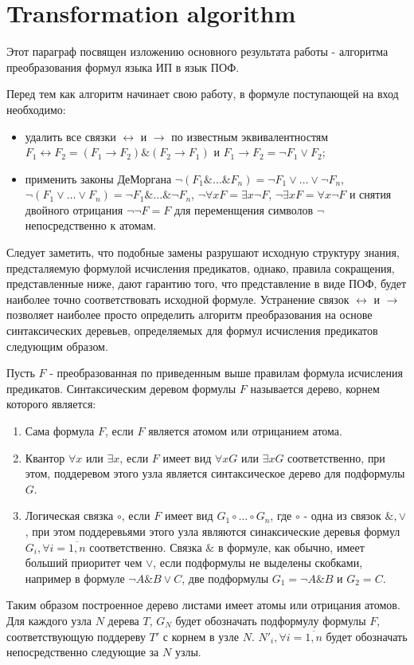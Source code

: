 \documentclass[a4paper,12pt]{article}
\begin{document}
\section{Transformation algorithm}

Этот параграф посвящен изложению основного результата работы - алгоритма преобразования формул языка ИП в язык ПОФ.

Перед тем как алгоритм начинает свою работу, в формуле поступающей на вход необходимо: 
\begin{itemize}
\item удалить все связки $\leftrightarrow$ и $\rightarrow$ по известным эквивалентностям $F_1\leftrightarrow F_2 = (F_1\rightarrow F_2)\&(F_2\rightarrow F_1)$ и $F_1\rightarrow F_2 = \neg F_1 \vee F_2$;
\item применить законы ДеМоргана $\neg (F_1\&\ldots\& F_n)=\neg F_1\vee\ldots\vee\neg F_n$, $\neg (F_1\vee\ldots\vee F_n)=\neg F_1\&\ldots\&\neg F_n$, $\neg\forall x F = \exists x \neg F$, $\neg\exists x F = \forall x \neg F$  и снятия двойного отрицания $\neg\neg F = F$ для переменщения символов $\neg$ непосредственно к атомам.
\end{itemize}
Следует заметить, что подобные замены разрушают исходную структуру знания, предсталяемую формулой исчисления предикатов, однако, правила сокращения, представленные ниже, дают гарантию того, что представление в виде ПОФ, будет наиболее точно соответствовать исходной формуле. Устранение связок  $\leftrightarrow$ и $\rightarrow$ позволяет наиболее просто определить алгоритм преобразования на основе синтаксических деревьев, определяемых для формул исчисления предикатов следующим образом.

Пусть $F$ - преобразованная по приведенным выше правилам формула исчисления предикатов. Синтаксическим деревом формулы $F$ называется дерево, корнем которого является:
\begin{enumerate}
\item Сама формула $F$, если $F$ является атомом или отрицанием атома.
\item Квантор $\forall x$ или $\exists x$, если $F$ имеет вид $\forall x G$ или $\exists x G$ соответственно, при этом, поддеревом этого узла является  синтаксическое дерево для подформулы $G$.
\item Логическая связка $\circ$, если $F$ имеет вид $G_1\circ\ldots\circ G_n$, где $\circ$ - одна из связок $\&,\vee$, при этом поддеревьями этого узла являются синаксические деревья формул $G_i, \forall i=\overline{1,n}$ соответственно. Связка $\&$ в формуле, как обычно, имеет больший приоритет чем $\vee$, если подформулы не выделены скобками, например в формуле $\neg A \& B \vee C$, две подформулы $G_1 = \neg A\& B$ и $G_2 = C$.
\end{enumerate}
Таким образом построенное дерево листами имеет атомы или отрицания атомов. Для каждого узла $N$ дерева $T$, $G_N$ будет обозначать подформулу формулы $F$, соответствующую поддереву $T'$ с корнем в узле $N$. $N'_i,\forall i=\overline{1,n}$ будет обозначать непосредственно следующие за $N$ узлы.
\end{document}
